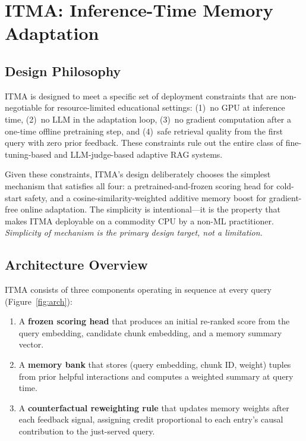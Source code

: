 \documentclass[preprint,12pt]{elsarticle}
\begin{document}
\section{ITMA: Inference-Time Memory Adaptation}
\label{sec:itma}

\subsection{Design Philosophy}
ITMA is designed to meet a specific set of deployment constraints that are
non-negotiable for resource-limited educational settings: (1)~no GPU at
inference time, (2)~no LLM in the adaptation loop, (3)~no gradient computation
after a one-time offline pretraining step, and (4)~safe retrieval quality from
the first query with zero prior feedback.  These constraints rule out the entire
class of fine-tuning-based and LLM-judge-based adaptive RAG systems.

Given these constraints, ITMA's design deliberately chooses the simplest
mechanism that satisfies all four: a pretrained-and-frozen scoring head for
cold-start safety, and a cosine-similarity-weighted additive memory boost for
gradient-free online adaptation.  The simplicity is intentional---it is the
property that makes ITMA deployable on a commodity CPU by a non-ML practitioner.
\emph{Simplicity of mechanism is the primary design target, not a limitation.}

\subsection{Architecture Overview}
ITMA consists of three components operating in sequence at every query
(Figure~\ref{fig:arch}):
\begin{enumerate}
  \item A \textbf{frozen scoring head} that produces an initial re-ranked
        score from the query embedding, candidate chunk embedding, and a
        memory summary vector.
  \item A \textbf{memory bank} that stores (query embedding, chunk ID,
        weight) tuples from prior helpful interactions and computes a
        weighted summary at query time.
  \item A \textbf{counterfactual reweighting rule} that updates memory
        weights after each feedback signal, assigning credit proportional
        to each entry's causal contribution to the just-served query.
\end{enumerate}
\end{document}

